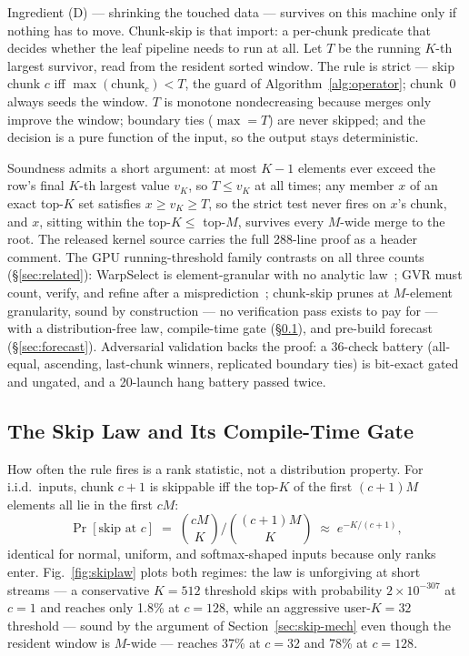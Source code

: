 Ingredient (D) --- shrinking the touched data --- survives on this
machine only if nothing has to move. Chunk-skip is that import: a
per-chunk predicate that decides whether the leaf pipeline needs to run
at all. Let $T$ be the running $K$-th largest survivor, read from the
resident sorted window. The rule is strict --- skip chunk $c$ iff
$\max(\text{chunk}_c) < T$, the guard of Algorithm~\ref{alg:operator};
chunk~0 always seeds the window. $T$ is monotone nondecreasing because
merges only improve the window; boundary ties ($\max = T$) are never
skipped; and the decision is a pure function of the input, so the
output stays deterministic.

Soundness admits a short argument: at most $K{-}1$ elements ever exceed
the row's final $K$-th largest value $v_K$, so $T \le v_K$ at all times;
any member $x$ of an exact top-$K$ set satisfies $x \ge v_K \ge T$, so
the strict test never fires on $x$'s chunk, and $x$, sitting within the
top-$K \le$ top-$M$, survives every $M$-wide merge to the root. The
released kernel source carries the full 288-line proof as a header
comment. The GPU running-threshold family contrasts on all three
counts (\S\ref{sec:related}): WarpSelect is element-granular with no
analytic law~\cite{johnson2019billion}; GVR must count, verify, and
refine after a misprediction~\cite{gvr2026}; chunk-skip prunes at
$M$-element granularity, sound by construction --- no verification
pass exists to pay for --- with a distribution-free law, compile-time
gate (\S\ref{sec:skip-law}), and pre-build forecast
(\S\ref{sec:forecast}). Adversarial validation
backs the proof: a 36-check battery (all-equal, ascending, last-chunk
winners, replicated boundary ties) is bit-exact gated and ungated, and
a 20-launch hang battery passed twice.

\subsection{The Skip Law and Its Compile-Time Gate}
\label{sec:skip-law}

How often the rule fires is a rank statistic, not a distribution
property. For i.i.d.\ inputs, chunk $c{+}1$ is skippable iff the top-$K$
of the first $(c{+}1)M$ elements all lie in the first $cM$:
\begin{equation}
  \Pr[\text{skip at } c] \;=\;
  \binom{cM}{K} \Big/ \binom{(c+1)M}{K}
  \;\approx\; e^{-K/(c+1)},
  \label{eq:skiplaw}
\end{equation}
identical for normal, uniform, and softmax-shaped inputs because only
ranks enter. Fig.~\ref{fig:skiplaw} plots both regimes: the law is
unforgiving at short streams --- a conservative $K{=}512$ threshold
skips with probability $2\times10^{-307}$ at $c{=}1$ and reaches only
1.8\% at $c{=}128$, while an aggressive user-$K{=}32$ threshold ---
sound by the argument of Section~\ref{sec:skip-mech} even though the
resident window is $M$-wide --- reaches 37\% at $c{=}32$ and 78\% at
$c{=}128$.

